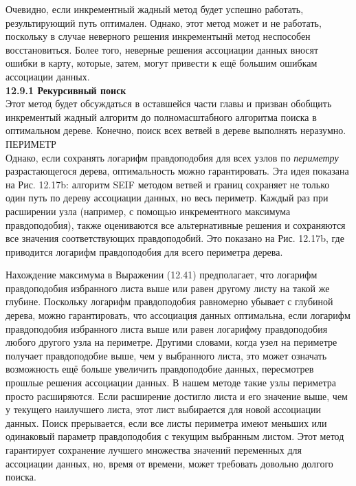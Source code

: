 \documentclass[10pt,a4paper]{article}
\begin{document}
Очевидно, если инкрементный жадный метод будет успешно работать, результирующий путь оптимален. Однако, этот метод может и не работать, поскольку в случае неверного решения инкрементынй метод неспособен восстановиться. Более того, неверные решения ассоциации данных вносят ошибки в карту, которые, затем, могут привести к ещё большим ошибкам ассоциации данных. \\

\textbf{12.9.1	Рекурсивный поиск}\\

Этот метод будет обсуждаться в оставшейся части главы и призван обобщить инкрементый жадный алгоритм до полномасштабного алгоритма поиска в оптимальном дереве. Конечно, поиск всех ветвей в дереве выполнять неразумно.\\ 

ПЕРИМЕТР\\

Однако, если сохранять логарифм правдоподобия для всех узлов по \textit{периметру} разрастающегося дерева, оптимальность можно гарантировать. Эта идея показана на Рис. 12.17b: алгоритм SEIF методом ветвей и границ сохраняет не только один путь по дереву ассоциации данных, но весь периметр. Каждый раз при расширении узла (например, с помощью инкрементного максимума правдоподобия),  также оцениваются все альтернативные решения и сохраняются все значения соответствующих правдоподобий.  Это показано на Рис. 12.17b, где приводится логарифм правдоподобия для всего периметра дерева.

Нахождение максимума в Выражении (12.41) предполагает, что логарифм правдоподобия избранного листа выше или равен другому листу на такой же глубине. Поскольку логарифм правдоподобия равномерно убывает с глубиной дерева, можно гарантировать, что ассоциация данных оптимальна, если логарифм правдоподобия избранного листа выше или равен логарифму правдоподобия любого другого узла на периметре. Другими словами, когда узел на периметре получает правдоподобие выше, чем у выбранного листа, это может означать возможность ещё больше увеличить правдоподобие данных, пересмотрев прошлые решения ассоциации данных. В нашем методе такие узлы периметра просто расширяются. Если расширение достигло листа и его значение выше, чем у текущего наилучшего листа, этот лист выбирается для новой ассоциации данных. Поиск прерывается, если все листы периметра имеют меньших или одинаковый параметр правдоподобия с текущим выбранным листом. Этот метод гарантирует сохранение лучшего множества значений переменных для ассоциации данных, но, время от времени, может требовать довольно долгого поиска.\\
\end{document}
